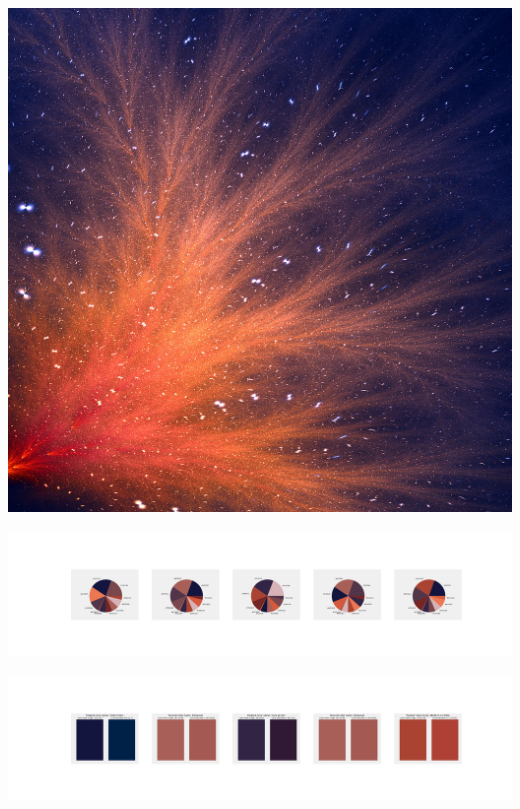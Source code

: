 \documentclass[11pt]{article}
\begin{document}
\begin{landscape}
    \begin{center}
    \includegraphics[width=\textwidth]{./nbimg/file (224).jpg}
    \end{center}

    \begin{center}
    \includegraphics[width=250mm]{./nbimg/pie-139.jpg}
    \end{center}

    \begin{center}
    \includegraphics[width=250mm]{./nbimg/peak-139.jpg}
    \end{center}
    


\end{landscape}
\end{document}
